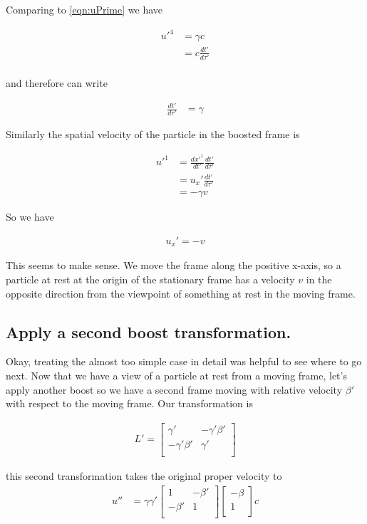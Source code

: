 \documentclass{article}
\begin{document}
Comparing to \ref{eqn:uPrime} we have

\begin{align*}
{u'}^4 
&= \gamma c \\
&= c \frac{{dt'}}{d\tau'} \\
\end{align*}

and therefore can write

\begin{align*}
\frac{{dt'}}{d\tau'} 
&= \gamma 
\end{align*}

Similarly the spatial velocity of the particle in the boosted frame is

\begin{align*}
{u'}^1
&=
\frac{{dx'}^1}{dt'} \frac{{dt'}}{d\tau'} \\
&= u_x' \frac{{dt'}}{d\tau'} \\
&= - \gamma v
\end{align*}

So we have 

\begin{align*}
u_x' = -v 
\end{align*}

This seems to make sense.  We move the frame along the positive x-axis, so a particle at rest at the origin of the stationary frame has a velocity $v$ in the opposite direction from the viewpoint of something at rest in the moving frame.

\subsection{Apply a second boost transformation. }

Okay, treating the almost too simple case in detail was helpful to see where to go next.  Now that we have a view of a particle at rest
from a moving frame, let's apply another boost so we have a second frame moving with relative velocity $\beta'$ with respect to the moving
frame.  Our transformation is

\begin{align*}
L' =
\begin{bmatrix}
\gamma' & - \gamma' \beta' \\
- \gamma' \beta' & \gamma' \\
\end{bmatrix}
\end{align*}

this second transformation takes the original proper velocity to
\begin{align*}
u'' &=
\gamma \gamma'
\begin{bmatrix}
1 & - \beta' \\
- \beta' & 1 \\
\end{bmatrix}
\begin{bmatrix}
- \beta \\
1 \\
\end{bmatrix}
c \\
\end{align*}
\end{document}
